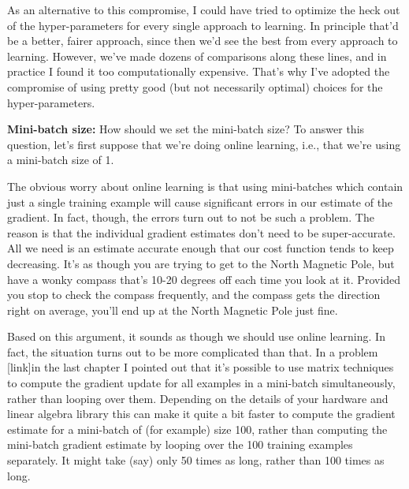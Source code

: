 \documentclass[a4paper,twoside,10pt]{book}
\begin{document}
As an alternative to this compromise, I could have tried to optimize the heck out of the hyper-parameters for every single approach to learning. In principle that'd be a better, fairer approach, since then we'd see the best from every approach to learning. However, we've made dozens of comparisons along these lines, and in practice I found it too computationally expensive. That's why I've adopted the compromise of using pretty good (but not necessarily optimal) choices for the hyper-parameters.


\textbf{Mini-batch size:} How should we set the mini-batch size? To answer this question, let's first suppose that we're doing online learning, i.e., that we're using a mini-batch size of 1.

The obvious worry about online learning is that using mini-batches which contain just a single training example will cause significant errors in our estimate of the gradient. In fact, though, the errors turn out to not be such a problem. The reason is that the individual gradient estimates don't need to be super-accurate. All we need is an estimate accurate enough that our cost function tends to keep decreasing. It's as though you are trying to get to the North Magnetic Pole, but have a wonky compass that's 10-20 degrees off each time you look at it. Provided you stop to check the compass frequently, and the compass gets the direction right on average, you'll end up at the North Magnetic Pole just fine.

Based on this argument, it sounds as though we should use online learning. In fact, the situation turns out to be more complicated than that. In a problem [link]in the last chapter I pointed out that it's possible to use matrix techniques to compute the gradient update for all examples in a mini-batch simultaneously, rather than looping over them. Depending on the details of your hardware and linear algebra library this can make it quite a bit faster to compute the gradient estimate for a mini-batch of (for example) size 100, rather than computing the mini-batch gradient estimate by looping over the 100 training examples separately. It might take (say) only 50 times as long, rather than 100 times as long.
\end{document}
